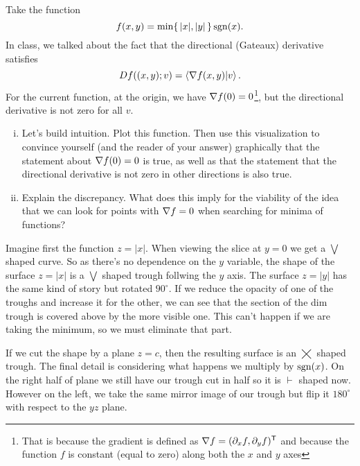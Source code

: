 \documentclass[12pt]{memoir}
\begin{document}
\begin{Ej}
    
    Take the function 
    $$f(x,y)=\min\{\,|x|,|y|\,\}\operatorname{sgn}(x).$$
    In class, we talked about the fact that the directional (Gateaux) derivative satisfies
    $$Df((x,y);v)=\braket{\nabla f(x,y)}{v}.$$
    For the current function, at the origin, we have $\nabla f(0)=0$\footnote{That is because the gradient is defined as $\nabla f=(\partial_x f,\partial_y f)^{\mathsf{T}}$ and because the function $f$ is constant (equal to zero) along both the $x$ and $y$ axes}, but the directional derivative is not zero for all $v$.
    \begin{enumerate}[i)]
        \item Let's build intuition. Plot this function. Then use this visualization to convince yourself (and the
        reader of your answer) graphically that the statement about $\nabla f(0)=0$ is true, as well as that the
        statement that the directional derivative is not zero in other directions is also true.
        \item Explain the discrepancy. What does this imply for the viability of the idea that we can look for points
        with $\nabla f=0$ when searching for minima of functions?
    \end{enumerate}
   
\end{Ej}

\begin{ptcbr}
    Imagine first the function $z=|x|$. When viewing the slice at $y=0$ we get a $\bigvee$ shaped curve. So as there's no dependence on the $y$ variable, the shape of the surface $z=|x|$ is a $\bigvee$ shaped trough follwing the $y$ axis. The surface $z=|y|$ has the same kind of story but rotated $90^\circ$. If we reduce the opacity of one of the troughs and increase it for the other, we can see that the section of the dim trough is covered above by the more visible one. This can't happen if we are taking the minimum, so we must eliminate that part.\par 
    If we cut the shape by a plane $z=c$, then the resulting surface is an $\bigtimes$ shaped trough. The final detail is considering what happens we multiply by $\operatorname{sgn}(x)$. On the right half of plane we still have our trough cut in half so it is $\vdash$ shaped now. However on the left, we take the same mirror image of our trough but flip it $180^\circ$ with respect to the $yz$ plane.
\end{ptcbr}
\end{document}
